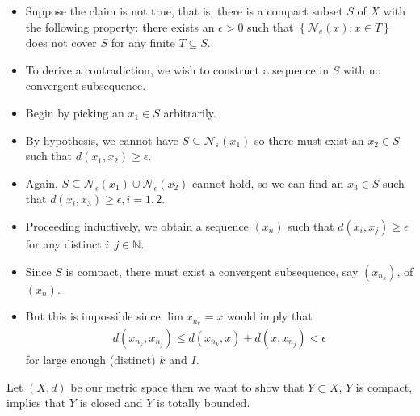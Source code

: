 \documentclass[12pt,a4paper]{article}
\begin{document}
\begin{itemize}
    \item Suppose the claim is not true, that is, there is a compact subset \(S\) of \(X\) with the following property: there exists an \(\epsilon>0\) such that \(\left\{\mathcal{N}_e(x): x \in T\right\}\) does not cover \(S\) for any finite \(T \subseteq S\).
    \item To derive a contradiction, we wish to construct a sequence in \(S\) with no convergent subsequence.
    \item Begin by picking an \(x_1 \in S\) arbitrarily.
    \item By hypothesis, we cannot have \(S \subseteq \mathcal{N}_{\varepsilon}\left(x_1\right)\) so there must exist an \(x_2 \in S\) such that \(d\left(x_1, x_2\right) \geq \epsilon\).
    \item Again, \(S \subseteq \mathcal{N}_\epsilon\left(x_1\right) \cup \mathcal{N}_\epsilon\left(x_2\right)\) cannot hold, so we can find an \(x_3 \in S\) such that \(d\left(x_i, x_3\right) \geq \epsilon, i=1,2\).
    \item Proceeding inductively, we obtain a sequence \(\left(x_n\right)\) such that \(d\left(x_i, x_j\right) \geq \epsilon\) for any distinct \(i, j \in \mathbb{N}\).
    \item Since \(S\) is compact, there must exist a convergent subsequence, say \(\left(x_{n_k}\right)\), of \(\left(x_n\right)\).
    \item But this is impossible since \(\lim x_{n_k}=x\) would imply that
    \begin{align*}
    d\left(x_{n_k}, x_{n_j}\right) \leq d\left(x_{n_k}, x\right)+d\left(x, x_{n_j}\right)<\epsilon
    \end{align*}
 for large enough (distinct) \(k\) and \(I\).
\end{itemize}

Let \(\left( X,d \right)\) be our metric space then we want to show that \(Y \subset X\), \(Y\) is compact, implies that \(Y\) is closed and \(Y\) is totally bounded.      
\end{document}

